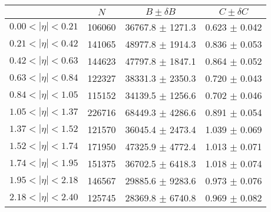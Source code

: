 \begin{tabular}{lccc}
\hline
    &   $N$   & $B \pm \delta B$  &  $C \pm \delta C$ \\
\hline
$0.00 < |\eta| <0.21$          & 106060     & 36767.8    $\pm$ 1271.3 & 0.623      $\pm$ 0.042 \\
$0.21 < |\eta| <0.42$          & 141065     & 48977.8    $\pm$ 1914.3 & 0.836      $\pm$ 0.053 \\
$0.42 < |\eta| <0.63$          & 144623     & 47797.8    $\pm$ 1847.1 & 0.864      $\pm$ 0.052 \\
$0.63 < |\eta| <0.84$          & 122327     & 38331.3    $\pm$ 2350.3 & 0.720      $\pm$ 0.043 \\
$0.84 < |\eta| <1.05$          & 115152     & 34139.5    $\pm$ 1256.6 & 0.702      $\pm$ 0.046 \\
$1.05 < |\eta| <1.37$          & 226716     & 68449.3    $\pm$ 4286.6 & 0.891      $\pm$ 0.054 \\
$1.37 < |\eta| <1.52$          & 121570     & 36045.4    $\pm$ 2473.4 & 1.039      $\pm$ 0.069 \\
$1.52 < |\eta| <1.74$          & 171950     & 47325.9    $\pm$ 4772.4 & 1.013      $\pm$ 0.071 \\
$1.74 < |\eta| <1.95$          & 151375     & 36702.5    $\pm$ 6418.3 & 1.018      $\pm$ 0.074 \\
$1.95 < |\eta| <2.18$          & 146567     & 29885.6    $\pm$ 9283.6 & 0.973      $\pm$ 0.076 \\
$2.18 < |\eta| <2.40$          & 125745     & 28369.8    $\pm$ 6740.8 & 0.969      $\pm$ 0.082 \\
\hline
\end{tabular}
